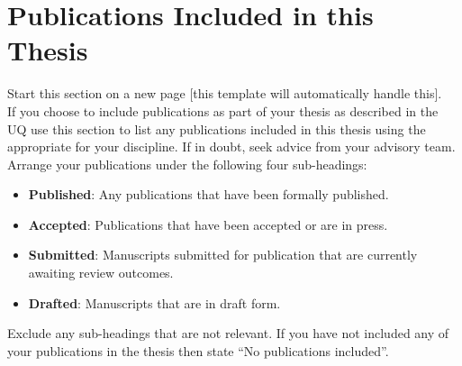 


\section*{Publications Included in this Thesis}
\begin{instructional}
	Start this section on a new page [this template will automatically handle this].\\
    
	\noindent
    If you choose to include publications as part of your thesis as described in the UQ \href{https://policies.uq.edu.au/document/view-current.php?id=452}{\color{blue}{HDR Examination Guidelines}} use this section to list any publications included in this thesis using the appropriate \href{https://guides.library.uq.edu.au/referencing}{\color{blue}{referencing style}} for your discipline. If in doubt, seek advice from your advisory team.\\

	\noindent
    Arrange your publications under the following four sub-headings:
    \begin{itemize}
        \item \textbf{Published}: Any publications that have been formally published.
        \item \textbf{Accepted}: Publications that have been accepted or are in press.
        \item \textbf{Submitted}: Manuscripts submitted for publication that are currently awaiting review outcomes.
        \item \textbf{Drafted}: Manuscripts that are in draft form.\\
    \end{itemize}

    \noindent
	Exclude any sub-headings that are not relevant. If you have not included any of your publications in the thesis then state ``No publications included''.\\


\end{instructional}
